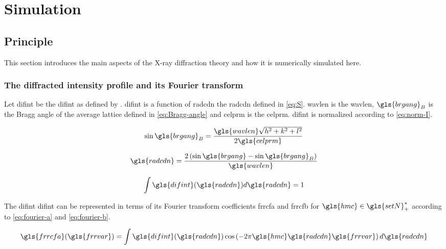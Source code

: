 \section{Simulation}

\subsection{Principle}

This section introduces the main aspects of the X-ray diffraction theory and how it is numerically simulated here.

\subsubsection{The diffracted intensity profile and its Fourier transform}

Let \gls{difint} be the \glsdesc{difint} as defined by \textcite{W1979}.
\gls{difint} is a function of \gls{radcdn} the \glsdesc{radcdn} defined in \eqref{eq:S}.
\gls{wavlen} is the \glsdesc{wavlen}, \( \gls{brgang}_B \) is the Bragg angle of the average lattice defined in \eqref{eq:Bragg-angle} and \gls{celprm} is the \glsdesc{celprm}.
\gls{difint} is normalized according to \eqref{eq:norm-I}.

\begin{equation}\label{eq:Bragg-angle}
\sin \gls{brgang}_B = \frac{\gls{wavlen} \sqrt{h^2+k^2+l^2}}{2 \gls{celprm}}
\end{equation}

\begin{equation}\label{eq:S}
\gls{radcdn} = \frac{2 \left( \sin \gls{brgang} - \sin \gls{brgang}_B \right)}{\gls{wavlen}}
\end{equation}

\begin{equation}\label{eq:norm-I}
\int \gls{difint}(\gls{radcdn}) d\gls{radcdn} = 1
\end{equation}

The \glsdesc{difint} \gls{difint} can be represented in terms of its Fourier transform coefficients \gls{frrcfa} and \gls{frrcfb} for \( {\gls{hmc}} \in \gls{setN}^*_+ \) according to \eqref{eq:fourier-a} and \eqref{eq:fourier-b}.

\begin{equation}\label{eq:fourier-a}
\gls{frrcfa}(\gls{frrvar}) = \int \gls{difint}(\gls{radcdn}) \cos \left( -2 \pi \gls{hmc} \gls{radcdn} \gls{frrvar} \right) d\gls{radcdn}
\end{equation}

